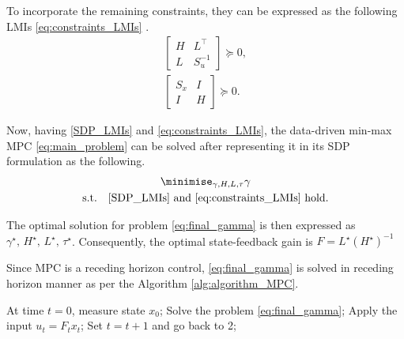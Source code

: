To incorporate the remaining constraints, they can be expressed as the following LMIs \eqref{eq:constraints_LMIs} \cite{xie2024}.
\begin{subequations} \label{eq:constraints_LMIs}
	\begin{gather}
		\begin{bmatrix}
			H & L^\top \\
			L & S_u^{-1}
		\end{bmatrix} \succeq 0,
		\\
		\begin{bmatrix}
			S_x & I \\
			I & H
		\end{bmatrix} \succeq 0.
	\end{gather}
\end{subequations}

Now, having \eqref{SDP_LMIs} and \eqref{eq:constraints_LMIs}, the data-driven min-max MPC \eqref{eq:main_problem} can be solved after representing it in its SDP formulation as the following.
\begin{subequations} \label{eq:final_gamma}
	\begin{gather}
		\minimise_{\gamma, H, L, \tau} \gamma \\
		\text{s.t.} \quad \eqref{SDP_LMIs} \text{ and } \eqref{eq:constraints_LMIs} \text{ hold.}
	\end{gather}
\end{subequations}

The optimal solution for problem \eqref{eq:final_gamma} is then expressed as $\gamma^\star, \, H^\star, \, L^\star, \, \tau^\star$. Consequently, the optimal state-feedback gain is $F = L^\star (H^\star)^{-1}$

Since MPC is a receding horizon control, \eqref{eq:final_gamma} is solved in receding horizon manner as per the Algorithm \ref{alg:algorithm_MPC}.

\begin{algorithm}
	\caption{Data-driven min-max MPC}
	\begin{algorithmic}[1]
		\STATE At time $t = 0$, measure state $x_0$;
		\STATE Solve the problem \eqref{eq:final_gamma};
		\STATE Apply the input $u_t = F_t x_t$;
		\STATE Set $t = t + 1$ and go back to 2;
	\end{algorithmic}
	\label{alg:algorithm_MPC}
\end{algorithm}

%




